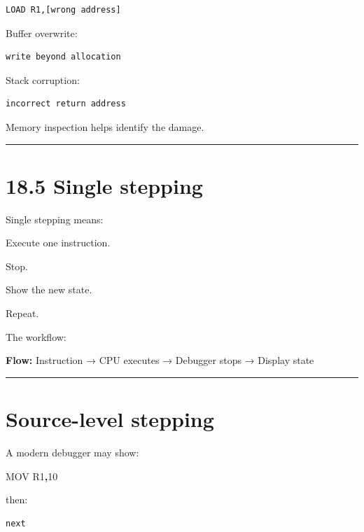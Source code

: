 \documentclass[
  oneside,
  openany]{book}
\newenvironment{Shaded}{\begin{snugshade}}{\end{snugshade}}
\newcommand{\BuiltInTok}[1]{#1}
\newcommand{\DecValTok}[1]{\textcolor[rgb]{0.00,0.00,0.81}{#1}}
\newcommand{\NormalTok}[1]{#1}
\newcommand{\OperatorTok}[1]{\textcolor[rgb]{0.81,0.36,0.00}{\textbf{#1}}}
\begin{document}
\begin{verbatim}
LOAD R1,[wrong address]
\end{verbatim}

Buffer overwrite:

\begin{verbatim}
write beyond allocation
\end{verbatim}

Stack corruption:

\begin{verbatim}
incorrect return address
\end{verbatim}

Memory inspection helps identify the damage.

\begin{center}\rule{0.5\linewidth}{0.5pt}\end{center}

\hypertarget{single-stepping}{%
\section{18.5 Single stepping}\label{single-stepping}}

Single stepping means:

Execute one instruction.

Stop.

Show the new state.

Repeat.

The workflow:

\textbf{Flow:} Instruction → CPU executes → Debugger stops → Display
state

\begin{center}\rule{0.5\linewidth}{0.5pt}\end{center}

\hypertarget{source-level-stepping}{%
\section{Source-level stepping}\label{source-level-stepping}}

A modern debugger may show:

\begin{Shaded}
\begin{Highlighting}[]
\BuiltInTok{MOV}\NormalTok{ R1}\OperatorTok{,}\DecValTok{10}
\end{Highlighting}
\end{Shaded}

then:

\begin{verbatim}
next
\end{verbatim}
\end{document}
